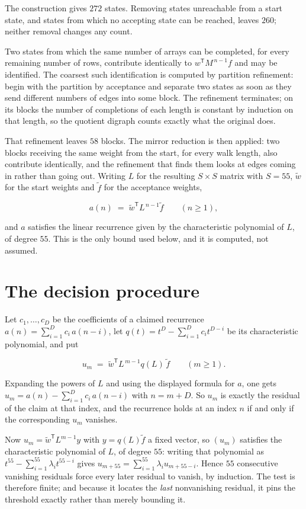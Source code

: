 \documentclass[11pt]{article}
\theoremstyle{definition}
\begin{document}
The construction gives $272$ states. Removing states unreachable from a start state, and states from which no accepting state can be reached, leaves $260$; neither removal changes any count.

Two states from which the same number of arrays can be completed, for every remaining number of rows, contribute identically to $w^{\mathsf T}M^{\,n-1}f$ and may be identified. The coarsest such identification is computed by partition refinement: begin with the partition by acceptance and separate two states as soon as they send different numbers of edges into some block. The refinement terminates; on its blocks the number of completions of each length is constant by induction on that length, so the quotient digraph counts exactly what the original does.

That refinement leaves $58$ blocks. The mirror reduction is then applied: two blocks receiving the same weight from the start, for every walk length, also contribute identically, and the refinement that finds them looks at edges coming in rather than going out. Writing $L$ for the resulting $S \times S$ matrix with $S = 55$, $\tilde w$ for the start weights and $\tilde f$ for the acceptance weights,

\[a(n) \;=\; \tilde w^{\mathsf T} L^{\,n-1} \tilde f \qquad (n \ge 1),\]

and $a$ satisfies the linear recurrence given by the characteristic polynomial of $L$, of degree $55$. This is the only bound used below, and it is computed, not assumed.

\section{The decision procedure}

Let $c_1,\dots,c_D$ be the coefficients of a claimed recurrence $a(n) = \sum_{i=1}^{D} c_i\,a(n-i)$, let $q(t) = t^{D} - \sum_{i=1}^{D} c_i t^{D-i}$ be its characteristic polynomial, and put

\[u_m \;=\; \tilde w^{\mathsf T} L^{\,m-1} q(L)\,\tilde f \qquad (m \ge 1).\]

Expanding the powers of $L$ and using the displayed formula for $a$, one gets $u_m = a(n) - \sum_{i=1}^{D} c_i\,a(n-i)$ with $n = m + D$. So $u_m$ is exactly the residual of the claim at that index, and the recurrence holds at an index $n$ if and only if the corresponding $u_m$ vanishes.

Now $u_m = \tilde w^{\mathsf T} L^{m-1} y$ with $y = q(L)\tilde f$ a fixed vector, so $(u_m)$ satisfies the characteristic polynomial of $L$, of degree $55$: writing that polynomial as $t^{55} - \sum_{i=1}^{55} \lambda_i t^{55-i}$ gives $u_{m+55} = \sum_{i=1}^{55} \lambda_i u_{m+55-i}$. Hence $55$ consecutive vanishing residuals force every later residual to vanish, by induction. The test is therefore finite; and because it locates the {\itshape last} nonvanishing residual, it pins the threshold exactly rather than merely bounding it.
\end{document}
